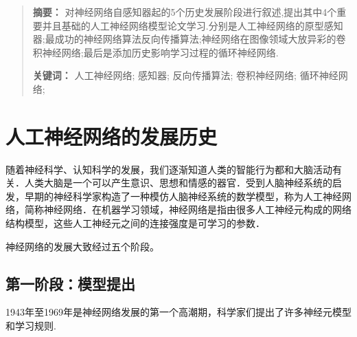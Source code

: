 \begin{abstract}
  \noindent \textbf{摘要：} 对神经网络自感知器起的5个历史发展阶段进行叙述,提出其中4个重要并且基础的人工神经网络模型论文学习.分别是人工神经网络的原型感知器;最成功的神经网络算法反向传播算法;神经网络在图像领域大放异彩的卷积神经网络;最后是添加历史影响学习过程的循环神经网络.
  \par\noindent \textbf{关键词：}  人工神经网络; 感知器; 反向传播算法; 卷积神经网络; 循环神经网络;
\end{abstract}
\setcounter{section}{0}
\section{人工神经网络的发展历史} %
\label{sec:背景介绍}

随着神经科学、认知科学的发展，我们逐渐知道人类的智能行为都和大脑活动有关．人类大脑是一个可以产生意识、思想和情感的器官．受到人脑神经系统的启发，早期的神经科学家构造了一种模仿人脑神经系统的数学模型，称为人工神经网络，简称神经网络．在机器学习领域，神经网络是指由很多人工神经元构成的网络结构模型，这些人工神经元之间的连接强度是可学习的参数．



神经网络的发展大致经过五个阶段。

\subsection{第一阶段：模型提出}

1943年至1969年是神经网络发展的第一个高潮期，科学家们提出了许多神经元模型和学习规则.

